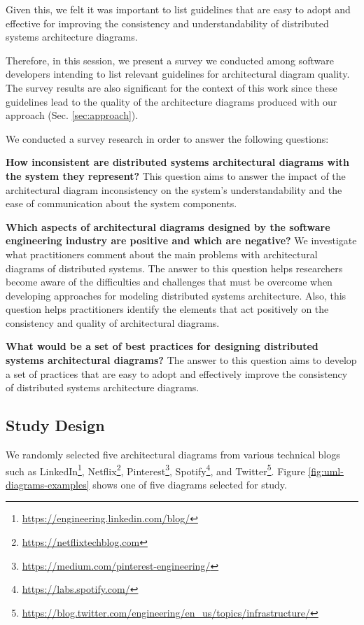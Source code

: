 \documentclass[sigconf]{acmart}
\begin{document}
Given this, we felt it was important to list guidelines that are easy to adopt and effective for improving the consistency and understandability of distributed systems architecture diagrams.

Therefore, in this session, we present a survey we conducted among software developers intending to list relevant guidelines for architectural diagram quality. The survey results are also significant for the context of this work since these guidelines lead to the quality of the architecture diagrams produced with our approach (Sec. \ref{sec:approach}).

We conducted a survey research in order to answer the following questions: 

\textbf{How inconsistent are distributed systems architectural diagrams with the system they represent?} This question aims to answer the impact of the architectural diagram inconsistency on the system's understandability and the ease of communication about the system components.

\textbf{Which aspects of architectural diagrams designed by the software engineering industry are positive and which are negative?}
We investigate what practitioners comment about the main problems with architectural diagrams of distributed systems.
The answer to this question helps researchers become aware of the difficulties and challenges that must be overcome when developing approaches for modeling distributed systems architecture. Also, this question helps practitioners identify the elements that act positively on the consistency and quality of architectural diagrams.

\textbf{What would be a set of best practices for designing distributed systems architectural diagrams?} The answer to this question aims to develop a set of practices that are easy to adopt and effectively improve the consistency of distributed systems architecture diagrams.

\subsection{Study Design}

We randomly selected five architectural diagrams from various technical blogs such as LinkedIn\footnote{\url{https://engineering.linkedin.com/blog/} }, Netflix\footnote{\url{https://netflixtechblog.com} }, Pinterest\footnote{\url{https://medium.com/pinterest-engineering/}}, Spotify\footnote{\url{https://labs.spotify.com/} }, and Twitter\footnote{\url{https://blog.twitter.com/engineering/en\_us/topics/infrastructure/}}. Figure \ref{fig:uml-diagrams-examples} shows one of five diagrams selected for study.
\end{document}
